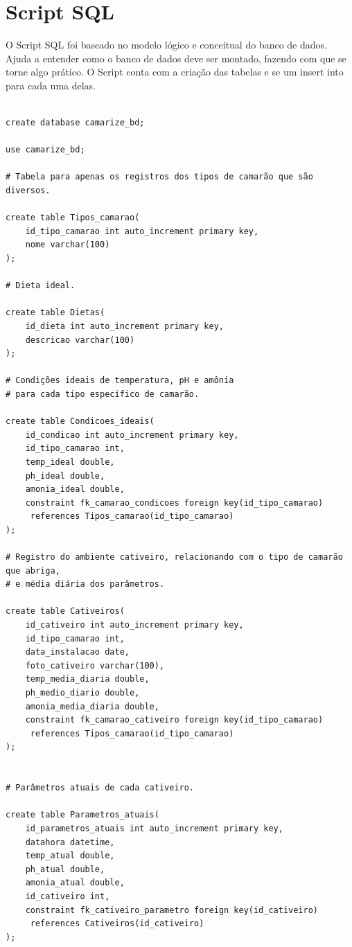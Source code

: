 \documentclass[
  a4paper,
  12pt,
  english,
  brazilian,
]{article}
\begin{document}
\section*{\textbf{Script SQL}}

O Script SQL foi baseado no modelo lógico e conceitual do banco de dados. Ajuda a entender como o banco de dados deve ser montado, fazendo com que se torne algo prático. O Script conta com a criação das tabelas e se um insert into para cada uma delas.

\begin{verbatim}
    
create database camarize_bd;

use camarize_bd;
	 
# Tabela para apenas os registros dos tipos de camarão que são diversos.

create table Tipos_camarao(
	id_tipo_camarao int auto_increment primary key,
	nome varchar(100)
);
	 
# Dieta ideal.

create table Dietas(
	id_dieta int auto_increment primary key,
	descricao varchar(100)
);
	 
# Condições ideais de temperatura, pH e amônia 
# para cada tipo especifico de camarão.

create table Condicoes_ideais(
	id_condicao int auto_increment primary key,
	id_tipo_camarao int,
	temp_ideal double,
	ph_ideal double,
	amonia_ideal double,
	constraint fk_camarao_condicoes foreign key(id_tipo_camarao)
     references Tipos_camarao(id_tipo_camarao)
);

# Registro do ambiente cativeiro, relacionando com o tipo de camarão que abriga, 
# e média diária dos parâmetros.

create table Cativeiros(
	id_cativeiro int auto_increment primary key,
	id_tipo_camarao int,
	data_instalacao date,
	foto_cativeiro varchar(100),
	temp_media_diaria double,
	ph_medio_diario double,
	amonia_media_diaria double,
	constraint fk_camarao_cativeiro foreign key(id_tipo_camarao)
     references Tipos_camarao(id_tipo_camarao)
);

	 
# Parâmetros atuais de cada cativeiro.

create table Parametros_atuais(
	id_parametros_atuais int auto_increment primary key,
	datahora datetime,
	temp_atual double,
	ph_atual double,
	amonia_atual double,
	id_cativeiro int,
	constraint fk_cativeiro_parametro foreign key(id_cativeiro)
     references Cativeiros(id_cativeiro)
);
	 

\end{verbatim}
\end{document}
